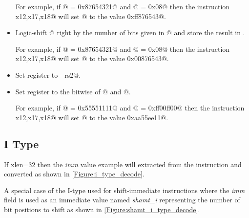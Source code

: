 \begin{itemize}
For example, if @ = \verb@0x87654321@ and @ = \verb@0x08@
then the instruction \verb@sll x12,x17,x18@ will set @ to the
value \verb@0xff876543@.

\item{}
\label{insn:srl}

Logic-shift @ right by the number of bits given in @ and
store the result in \verb@rd@.

For example, if @ = \verb@0x87654321@ and @ = \verb@0x08@
then the instruction \verb@sll x12,x17,x18@ will set @ to the
value \verb@0x00876543@.

\item{}
\label{insn:sub}

Set register \verb@rd@ to  - rs2@.

\item{}
\label{insn:xor}

Set register \verb@rd@ to the bitwise \verb@xor@ of @ and  @.

For example, if @ = \verb@0x55551111@ and @ = \verb@0xff00ff00@
then the instruction \verb@xor x12,x17,x18@ will set @ to the
value \verb@0xaa55ee11@.

\end{itemize}



\subsection{I Type}
\label{insnformat:itype}

If \Gls{xlen}=32 then the {\em imm} value example will extracted from the instruction
and converted as shown in \autoref{Figure:i_type_decode}.

\begin{figure}[ht]
\centering
\DrawInsnOpITypeDecoding
{}
\label{Figure:i_type_decode}
\label{imm.i:decode}
\end{figure}

A special case of the I-type used for shift-immediate instructions where 
the {\em imm} field is used as an immediate value named {\em shamt\_i} 
representing the number of bit positions to shift as shown in 
\autoref{Figure:shamt_i_type_decode}.

